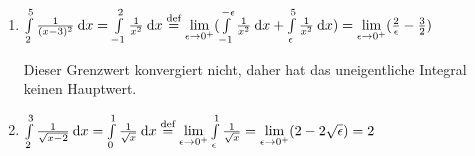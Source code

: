 \item

\begin{enumerate}
\item $\int\limits_2^5 \frac{1}{(x-3)^2}\:\mathrm{d}{x} = \int\limits_{-1}^2 \frac{1}{x^2} \:\mathrm{d}{x} \stackrel{\text{def}}{=} \lim\limits_{\epsilon\to 0^{+}} (\int\limits_{-1}^{-\epsilon} \frac{1}{x^2} \:\mathrm{d}{x} + \int\limits_{\epsilon}^5 \frac{1}{x^2}\:\mathrm{d}{x}) = \lim\limits_{\epsilon\to 0^{+}} (\frac{2}{\epsilon} - \frac{3}{2})$

Dieser Grenzwert konvergiert nicht, daher hat das uneigentliche Integral keinen Hauptwert.

\item $\int\limits_2^3 \frac{1}{\sqrt{x-2}}\:\mathrm{d}{x} = \int\limits_0^1 \frac{1}{\sqrt{x}}\:\mathrm{d}{x} \stackrel{\text{def}}{=} \lim\limits_{\epsilon\to 0^{+}} \int\limits_\epsilon^1 \frac{1}{\sqrt{x}} = \lim\limits_{\epsilon\to 0^{+}}(2-2\sqrt{\epsilon}) = 2$
\end{enumerate}

